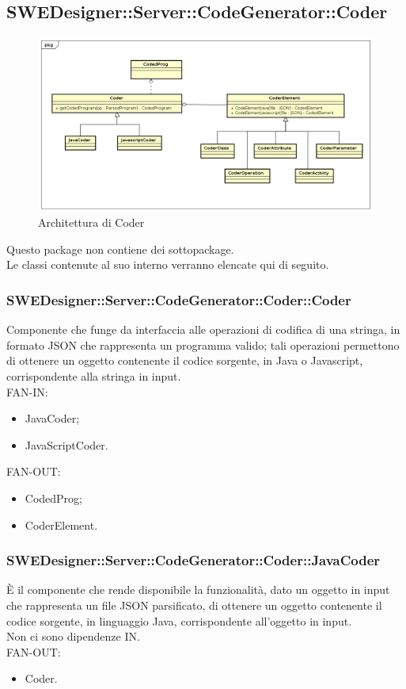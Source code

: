 \documentclass[../PianoDiQualifica.tex]{subfiles}
\begin{document}
		\subsection{SWEDesigner::Server::CodeGenerator::Coder}
			\begin{figure}[H]\label{fig:Coder}
				\centering
				\includegraphics[scale=0.46]{Immagini/DiagrammaArchitettura/Coder.png}
				\caption{Architettura di Coder}
			\end{figure}
		Questo package non contiene dei sottopackage.\\
		Le classi contenute al suo interno verranno elencate qui di seguito.
		\subsubsection{SWEDesigner::Server::CodeGenerator::Coder::Coder}
		Componente che funge da interfaccia alle operazioni di codifica di una stringa, in formato JSON che rappresenta un programma valido; tali operazioni permettono di ottenere un oggetto contenente il codice sorgente, in Java o Javascript, corrispondente alla stringa in input.\\
		FAN-IN:
		\begin{itemize}
			\item JavaCoder;
			\item JavaScriptCoder.
		\end{itemize}
		FAN-OUT:
		\begin{itemize}
			\item CodedProg;
			\item CoderElement.
		\end{itemize}
		\subsubsection{SWEDesigner::Server::CodeGenerator::Coder::JavaCoder}
		È il componente che rende disponibile la funzionalità, dato un oggetto in input che rappresenta un file JSON parsificato, di ottenere un oggetto contenente il codice sorgente, in linguaggio Java, corrispondente all'oggetto in input.\\
		Non ci sono dipendenze IN.\\
			FAN-OUT:
			\begin{itemize}
				\item Coder.
			\end{itemize}
\end{document}
